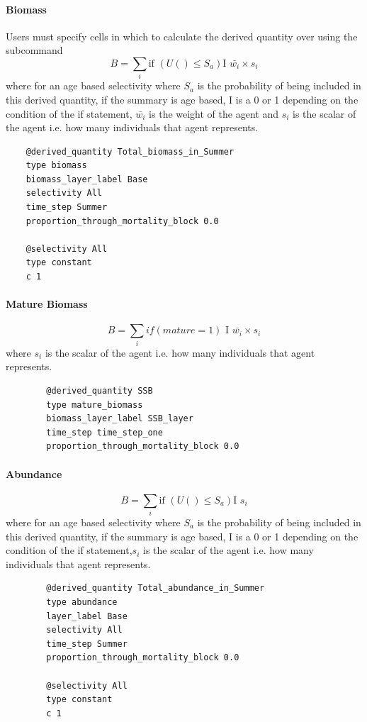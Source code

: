 \paragraph*{Biomass}\label{para:biomass}
Users must specify cells in which to calculate the derived quantity over using the subcommand 
\begin{equation}
	B = \sum_i \text{if }(U() \leq S_a)\text{I } \bar{w_i} \times s_i
\end{equation}
where for an age based selectivity where $S_a$ is the probability of being included in this derived quantity, if the summary is age based, I is a 0 or 1 depending on the condition of the if statement, $\bar{w_i}$ is the weight of the agent and $s_i$ is the scalar of the agent i.e. how many individuals that agent represents.
{\small{\begin{verbatim}
	@derived_quantity Total_biomass_in_Summer
	type biomass
	biomass_layer_label Base
	selectivity All
	time_step Summer
	proportion_through_mortality_block 0.0
	
	@selectivity All
	type constant
	c 1
\end{verbatim}}}


\paragraph*{Mature Biomass}\label{para:mature_biomass}

\begin{equation}
B = \sum_i if(mature = 1)\text{ I } \bar{w_i} \times s_i
\end{equation}
where $s_i$ is the scalar of the agent i.e. how many individuals that agent represents.

{\small{\begin{verbatim}
		@derived_quantity SSB
		type mature_biomass
		biomass_layer_label SSB_layer
		time_step time_step_one
		proportion_through_mortality_block 0.0
\end{verbatim}}}
	
\paragraph*{Abundance}\label{para:abundance}

\begin{equation}
B = \sum_i \text{if }(U() \leq S_a)\text{I } s_i
\end{equation}
where for an age based selectivity where $S_a$ is the probability of being included in this derived quantity, if the summary is age based, I is a 0 or 1 depending on the condition of the if statement,$s_i$ is the scalar of the agent i.e. how many individuals that agent represents.
{\small{\begin{verbatim}
		@derived_quantity Total_abundance_in_Summer
		type abundance
		layer_label Base
		selectivity All
		time_step Summer
		proportion_through_mortality_block 0.0
		
		@selectivity All
		type constant
		c 1
\end{verbatim}}}


